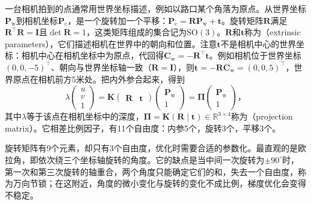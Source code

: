 一台相机拍到的点通常用世界坐标描述，例如以路口某个角落为原点。从世界坐标$\bm P_{\mathrm w}$到相机坐标$\bm P_{\mathrm c}$，是一个旋转加一个平移：$\bm P_{\mathrm c}=\bm R\bm P_{\mathrm w}+\bm t$。旋转矩阵$\bm R$满足$\bm R^\top\bm R=\bm I$且$\det\bm R=1$，这类矩阵组成的集合记为$\mathrm{SO}(3)$。$\bm R$和$\bm t$称为（extrinsic parameters），它们描述相机在世界中的朝向和位置。注意$\bm t$不是相机中心的世界坐标：相机中心在相机坐标中为原点，代回得$\bm C_{\mathrm w}=-\bm R^\top\bm t$。例如相机位于世界坐标$(0,0,-5)^\top$、朝向与世界坐标轴一致（$\bm R=\bm I$），则$\bm t=-\bm R\bm C_{\mathrm w}=(0,0,5)^\top$，世界原点在相机前方5米处。把内外参合起来，得到
\begin{equation}
  \lambda\begin{pmatrix}u\\v\\1\end{pmatrix}
  =\bm K\begin{pmatrix}\bm R&\bm t\end{pmatrix}
  \begin{pmatrix}\bm P_{\mathrm w}\\1\end{pmatrix}
  =\bm\Pi\begin{pmatrix}\bm P_{\mathrm w}\\1\end{pmatrix}\text{，}
  \label{eq:vision-formation-projection}
\end{equation}
其中$\lambda$等于该点在相机坐标中的深度，$\bm\Pi=\bm K(\bm R\mid\bm t)\in\mathbb{R}^{3\times4}$称为（projection matrix）。它相差比例因子，有11个自由度：内参5个，旋转3个，平移3个。

旋转矩阵有9个元素，却只有3个自由度，优化时需要合适的参数化。最直观的是欧拉角，即依次绕三个坐标轴旋转的角度。它的缺点是当中间一次旋转为$\pm90^\circ$时，第一次和第三次旋转的轴重合，两个角度只能确定它们的和，失去一个自由度，称为万向节锁；在这附近，角度的微小变化与旋转的变化不成比例，梯度优化会变得不稳定。

